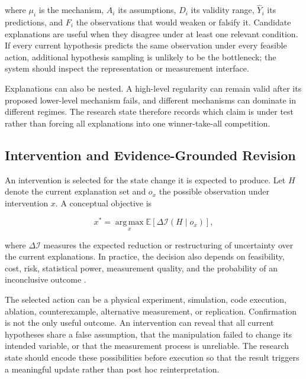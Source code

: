 \documentclass[11pt, a4paper, copyright]{google}
\begin{document}
where $\mu_i$ is the mechanism, $A_i$ its assumptions, $D_i$ its validity range, $\widehat{Y}_i$ its predictions, and $F_i$ the observations that would weaken or falsify it. Candidate explanations are useful when they disagree under at least one relevant condition. If every current hypothesis predicts the same observation under every feasible action, additional hypothesis sampling is unlikely to be the bottleneck; the system should inspect the representation or measurement interface.

Explanations can also be nested. A high-level regularity can remain valid after its proposed lower-level mechanism fails, and different mechanisms can dominate in different regimes. The research state therefore records which claim is under test rather than forcing all explanations into one winner-take-all competition.

\subsection{Intervention and Evidence-Grounded Revision}
\label{subsec:discriminating-interventions}

An intervention is selected for the state change it is expected to produce. Let $H$ denote the current explanation set and $o_x$ the possible observation under intervention $x$. A conceptual objective is

\begin{equation}
x^{*}
=
\operatorname*{arg\,max}_{x}
\mathbb{E}[\Delta\mathcal{I}(H\mid o_x)],
\label{eq:discriminating-intervention}
\end{equation}

where $\Delta\mathcal{I}$ measures the expected reduction or restructuring of uncertainty over the current explanations. In practice, the decision also depends on feasibility, cost, risk, statistical power, measurement quality, and the probability of an inconclusive outcome \citep{chaloner1995bayesdesign,gandhi2025boxinggym}.

The selected action can be a physical experiment, simulation, code execution, ablation, counterexample, alternative measurement, or replication. Confirmation is not the only useful outcome. An intervention can reveal that all current hypotheses share a false assumption, that the manipulation failed to change its intended variable, or that the measurement process is unreliable. The research state should encode these possibilities before execution so that the result triggers a meaningful update rather than post hoc reinterpretation.
\end{document}
